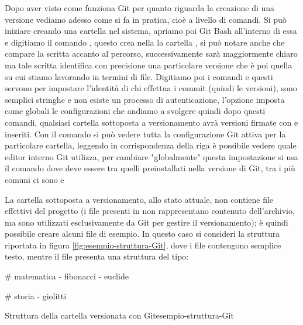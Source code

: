 Dopo aver visto come funziona Git per quanto riguarda la creazione di una versione vediamo adesso come si fa in pratica, cioè a livello di comandi. Si può iniziare creando una cartella nel sistema, apriamo poi Git Bash all'interno di essa e digitiamo il comando , questo crea nella la cartella , si può notare anche che compare la scritta  accanto al percorso, successivamente sarà maggiormente chiaro ma tale scritta identifica con precisione una particolare versione che è poi quella su cui stiamo lavorando in termini di file. Digitiamo poi i comandi  e  questi servono per impostare l'identità di chi effettua i commit (quindi le versioni), sono semplici stringhe e non esiste un processo di autenticazione, l'opzione  imposta come globali le configurazioni che andiamo a svolgere quindi dopo questi comandi, qualsiasi cartella sottoposta a versionamento avrà versioni firmate con  e  inseriti. Con il comando  si può vedere tutta la configurazione Git attiva per la particolare cartella, leggendo in corrispondenza della riga  è possibile vedere quale editor interno Git utilizza, per cambiare "globalmente" questa impostazione si usa il comando  dove  deve essere tra quelli preinstallati nella versione di Git, tra i più comuni ci sono  e 

La cartella sottoposta a versionamento, allo stato attuale, non contiene file effettivi del progetto (i file presenti in  non rappresentano contenuto dell'archivio, ma sono utilizzati esclusivamente da Git per gestire il versionamento); è quindi possibile creare alcuni file di esempio. 
In questo caso si consideri la struttura riportata in figura \ref{fig:esempio-struttura-Git}, dove i file  contengono semplice testo, mentre il file  presenta una struttura del tipo:

\begin{cmd}
	# matematica
	- fibonacci
	- euclide
	
	# storia
	- giolitti
\end{cmd}

\begin{figtree}{Struttura della cartella  versionata con Git}{esempio-struttura-Git}
\end{figtree}

